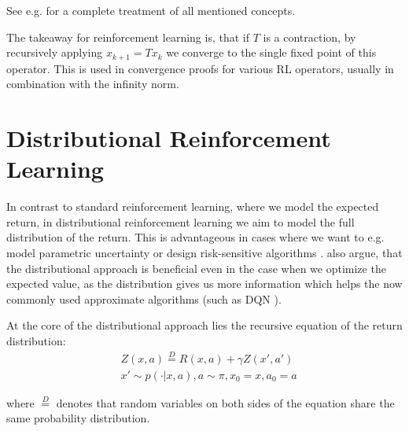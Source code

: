 See e.g. \citet{kreyszig1989introductory} for a complete treatment of all mentioned concepts.

The takeaway for reinforcement learning is, that if $T$ is a contraction, by recursively applying $x_{k+1}=Tx_k$ we converge to the single fixed point of this operator. This is used in convergence proofs for various RL operators, usually in combination with the infinity norm.






\section{Distributional Reinforcement Learning}\label{sec:distrl}

In contrast to standard reinforcement learning, where we model the expected return, in distributional reinforcement learning \cite{many} we aim to model the full distribution of the return. This is advantageous in cases where we want to e.g. model parametric uncertainty \cite{...} or design risk-sensitive algorithms \citep{morimura2012parametric}\citep{morimura2010nonparametric}. \citet{bellemare2017distributional} also argue, that the distributional approach is beneficial even in the case when we optimize the expected value, as the distribution gives us more information which helps the now commonly used approximate algorithms (such as DQN \citep{mnih2015human}).

At the core of the distributional approach lies the recursive equation of the return distribution:
\begin{equation}
\begin{split}
&Z(x, a) \overset{D}{=} R(x, a) + \gamma Z(x', a')\\
&x' \sim p(\cdot|x, a), a \sim \pi, x_0 = x, a_0 = a
\end{split}
\end{equation}

where $\overset{D}{=}$ denotes that random variables on both sides of the equation share the same probability distribution.

